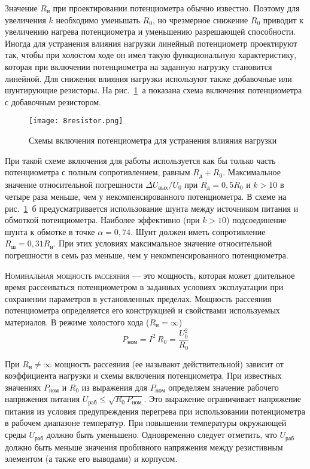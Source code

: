 Значение $ R_\text{н} $ при проектировании потенциометра обычно известно. Поэтому для увеличения $ k $ необходимо уменьшать $ R_0 $, но чрезмерное снижение $ R_0 $ приводит к увеличению нагрева потенциометра и уменьшению разрешающей способности. Иногда для устранения влияния нагрузки линейный потенциометр проектируют так, чтобы при холостом ходе он имел такую функциональную характеристику, которая при включении потенциометра на заданную нагрузку становится линейной. Для снижения влияния нагрузки используют также добавочные или шунтирующие резисторы. На рис.~\ref{pic:8resistor}~а показана схема включения потенциометра с добавочным резистором.

\begin{figure}[h!]
	\begin{center}
		\texttt{[image: 8resistor.png]}
		\caption{ Схемы включения потенциометра для устранения влияния нагрузки }
		\label{pic:8resistor}
	\end{center}
\end{figure}

При такой схеме включения для работы используется как бы только часть потенциометра с полным сопротивлением, равным $ R_\text{д} + R_0 $. Максимальное значение относительной погрешности $ \Delta U_\text{вых}/U_0 $ при $ R_\text{д}=0,5R_0 $ и $ k > 10 $ в четыре раза меньше, чем у некомпенсированного потенциометра. В схеме на рис.~\ref{pic:8resistor}~б предусматривается использование шунта между источником питания и обмоткой потенциометра. Наиболее эффективно (при $ k > 10 $) подсоединение шунта к обмотке в точке $ \alpha = 0,74 $. Шунт должен иметь сопротивление $ R_\text{ш} = 0,31 R_\text{н} $. При этих условиях максимальное значение относительной погрешности в семь раз меньше, чем у некомпенсированного потенциометра.

\textsc{Номинальная мощность рассеяния} --- это мощность, которая может длительное время рассеиваться потенциометром в заданных условиях эксплуатации при сохранении параметров в установленных пределах. Мощность рассеяния потенциометра определяется его конструкцией и свойствами используемых материалов. В режиме холостого хода ($ R_\text{н} = \infty $)   
\[ P_\text{ном} = I^2\,R_0 = \dfrac{U_0^2}{R_0}\]

При $ R_\text{н} \neq \infty $ мощность рассеяния (ее называют действительной) зависит от коэффициента нагрузки и схемы включения потенциометра. При известных значениях $ P_\text{ном} $ и $ R_0 $ из выражения для $ P_\text{ном} $ определяем значение рабочего напряжения питания $ U_\text{раб} \leq \sqrt{R_0\,P_\text{ном}} $. Это выражение ограничивает напряжение питания из условия предупреждения перегрева при использовании потенциометра в рабочем диапазоне температур. При повышении температуры окружающей среды $ U_\text{раб} $ должно быть уменьшено. Одновременно следует отметить, что $ U_\text{раб} $ должно быть меньше значения пробивного напряжения между резистивным элементом (а также его выводами) и корпусом.

